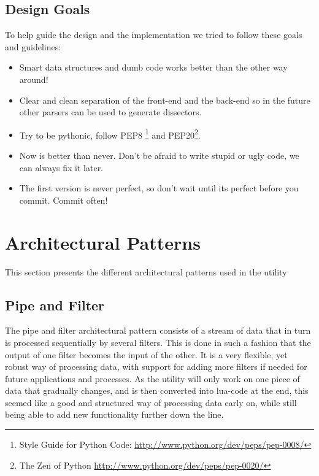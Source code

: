 \subsection{Design Goals}
To help guide the design and the implementation we tried to follow these goals and guidelines:
\begin{itemize}
	\item Smart data structures and dumb code works better than the other way around\cite{Raymond1999}!
	\item Clear and clean separation of the front-end and the back-end so in the future other parsers can be used to generate \glspl{dissector}.
	\item Try to be pythonic, follow  PEP8 \footnote{Style Guide for Python Code: \url{http://www.python.org/dev/peps/pep-0008/}} and PEP20\footnote{The Zen of Python \url{http://www.python.org/dev/peps/pep-0020/}}.
	\item Now is better than never. Don't be afraid to write stupid or ugly code, we can always fix it later.
	\item The first version is never perfect, so don't wait until its perfect before you commit. Commit often!
\end{itemize}

\section{Architectural Patterns}
This section presents the different architectural patterns used in the \gls{utility}

\subsection{Pipe and Filter}
The pipe and filter architectural pattern consists of a stream of data that in turn is processed sequentially by several filters. This is done in such a fashion that the output of one filter becomes the input of the other. It is a very flexible, yet robust way of processing data, with support for adding more filters if needed for future applications and processes. As the \gls{utility} will only work on one piece of data that gradually changes, and is then converted into \Gls{lua}-code at the end, this seemed like a good and structured way of processing data early on, while still being able to add new functionality further down the line.

